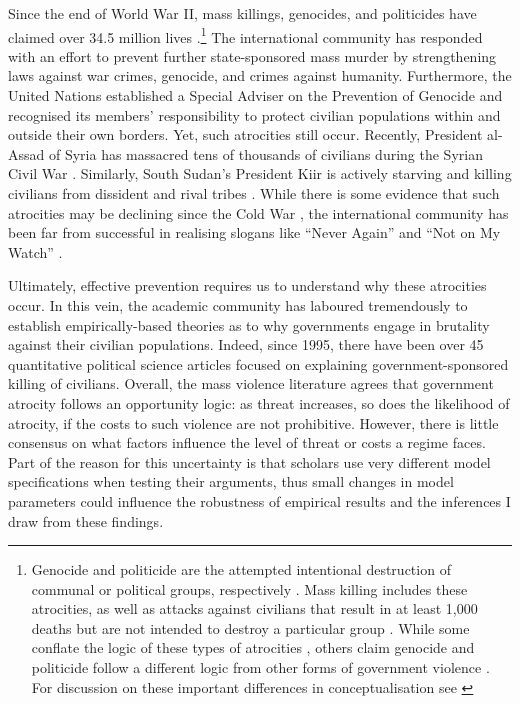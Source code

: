 \documentclass[a4paper,12pt]{article}
\begin{document}
Since the end of World War II, mass killings, genocides, and politicides have claimed over 34.5 million lives \citep{marshall2017pitf}.\footnote{Genocide and politicide are the attempted intentional destruction of communal or political groups, respectively \citep[see][]{harff1988toward}. Mass killing includes these atrocities, as well as attacks against civilians that result in at least 1,000 deaths but are not intended to destroy a particular group \citep[see][]{ulfelder2008assessing}. While some conflate the logic of these types of atrocities \citep[e.g.,][]{rummel1995democracy, valentino2004draining}, others claim genocide and politicide follow a different logic from other forms of government violence \citep{kalyvas2006logic,stanton2015regulating}. For discussion on these important differences in conceptualisation see \citep[]{straus2007second, finkel2012macro}} The international community has responded with an effort to prevent further state-sponsored mass murder by strengthening laws against war crimes, genocide, and crimes against humanity. Furthermore, the United Nations established a Special Adviser on the Prevention of Genocide and recognised its members' responsibility to protect civilian populations within and outside their own borders. Yet, such atrocities still occur. Recently, President al-Assad of Syria has massacred tens of thousands of civilians during the Syrian Civil War \citep{goldman2017nyt}. Similarly, South Sudan's President Kiir is actively starving and killing civilians from dissident and rival tribes \citep{nichols2017reuters}. While there is some evidence that such atrocities may be declining since the Cold War \citep{valentino2014we}, the international community has been far from successful in realising slogans like ``Never Again'' and ``Not on My Watch'' \citep{cheadle2007not}.
	
Ultimately, effective prevention requires us to understand why these atrocities occur. In this vein, the academic community has laboured tremendously to establish empirically-based theories as to why governments engage in brutality against their civilian populations. Indeed, since 1995, there have been over 45 quantitative political science articles focused on explaining government-sponsored killing of civilians. Overall, the mass violence literature agrees that government atrocity follows an opportunity logic: as threat increases, so does the likelihood of atrocity, if the costs to such violence are not prohibitive. However, there is little consensus on what factors influence the level of threat or costs a regime faces. Part of the reason for this uncertainty is that scholars use very different model specifications when testing their arguments, thus small changes in model parameters could influence the robustness of empirical results and the inferences I draw from these findings.
	
\end{document}
